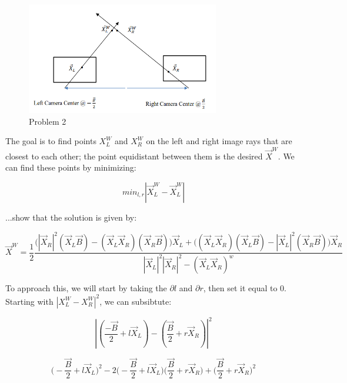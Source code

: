 \documentclass{article}
\begin{document}
\begin{figure}[H]
    \centering
    \includegraphics[width = 0.75\textwidth]{imgs/problem_2.png}
    \caption{Problem 2}
    \label{fig:prob-2}
\end{figure}

The goal is to find points $X_L^W$ and $X_R^W$ on the left and right image rays that are closest to each other; the point equidistant between them is the desired $\vec{X}^W$. We can find these points by minimizing:

\begin{equation}
    min_{l,r}|\vec{X}_L^W-\vec{X}_L^W|
\end{equation}

\noindent ...show that the solution is given by:

\begin{equation}
    \vec{X}^W=\frac{1}{2}\frac{\bigl(
        |\vec{X}_R|^2(\vec{X}_L\vec{B})-(\vec{X}_L\vec{X}_R)(\vec{X}_R\vec{B})\bigr)\vec{X}_L
        +
        \bigl(
            (\vec{X}_L\vec{X}_R)(\vec{X}_L\vec{B})-|\vec{X}_L|^2(\vec{X}_R\vec{B})
        \bigr)\vec{X}_R}{|\vec{X}_L|^2|\vec{X}_R|^2 - (\vec{X}_L\vec{X}_R)^w}
\end{equation}

\noindent To approach this, we will start by taking the $\partial l$ and $\partial r$, then set it equal to $0$. Starting with $|X_L^W-X_R^W|^2$, we can subsibtute:

\begin{equation}
    |(\frac{-\vec{B}}{2}+l\vec{X}_L)-(\frac{\vec{B}}{2}+r\vec{X}_R)|^2
\end{equation}

\begin{equation}
    \bigl(-\frac{\vec{B}}{2} +l\vec{X}_L\bigr)^2-
    2\bigl(-\frac{\vec{B}}{2}+l\vec{X}_L\bigr)
    \bigl(\frac{\vec{B}}{2}+r\vec{X}_R\bigr) +
    \bigl(\frac{\vec{B}}{2}+r\vec{X}_R\bigr)^2
\end{equation}
\end{document}
